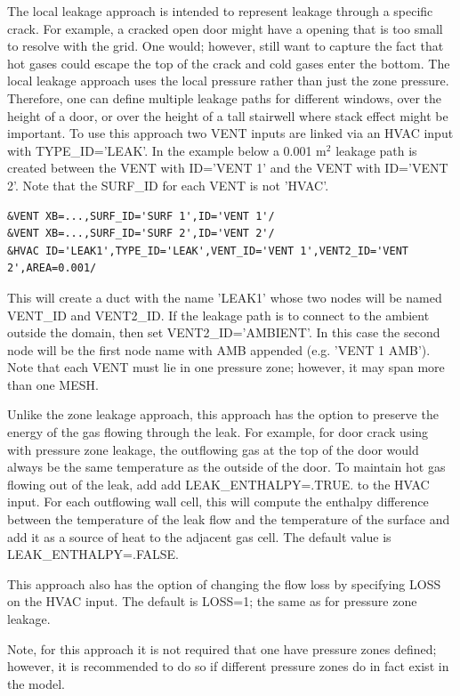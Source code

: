 \documentclass[11pt]{book}
\begin{document}
The local leakage approach is intended to represent leakage through a specific crack. For example, a cracked open door might have a opening that is too small to resolve with the grid.  One would; however, still want to capture the fact that hot gases could escape the top of the crack and cold gases enter the bottom. The local leakage approach uses the local pressure rather than just the zone pressure. Therefore, one can define multiple leakage paths for different windows, over the height of a door, or over the height of a tall stairwell where stack effect might be important. To use this approach two {\ct VENT} inputs are linked via an {\ct HVAC} input with {\ct TYPE\_ID='LEAK'}. In the example below a 0.001 m$^2$ leakage path is created between the {\ct VENT} with {\ct ID='VENT 1'} and the {\ct VENT} with {\ct ID='VENT 2'}. Note that the {\ct SURF\_ID} for each {\ct VENT} is not {\ct 'HVAC'}.
\begin{lstlisting}
&VENT XB=...,SURF_ID='SURF 1',ID='VENT 1'/
&VENT XB=...,SURF_ID='SURF 2',ID='VENT 2'/
&HVAC ID='LEAK1',TYPE_ID='LEAK',VENT_ID='VENT 1',VENT2_ID='VENT 2',AREA=0.001/
\end{lstlisting}
This will create a duct with the name {\ct 'LEAK1'} whose two nodes will be named {\ct VENT\_ID} and {\ct VENT2\_ID}. If the leakage path is to connect to the ambient outside the domain, then set {\ct VENT2\_ID='AMBIENT'}. In this case the second node will be the first node name with {\ct AMB} appended (e.g. {\ct 'VENT 1 AMB'}). Note that each {\ct VENT} must lie in one pressure zone; however, it may span more than one {\ct MESH}.

Unlike the zone leakage approach, this approach has the option to preserve the energy of the gas flowing through the leak. For example, for door crack using with pressure zone leakage, the outflowing gas at the top of the door would always be the same temperature as the outside of the door. To maintain hot gas flowing out of the leak, add add {\ct LEAK\_ENTHALPY=.TRUE.} to the {\ct HVAC} input. For each outflowing wall cell, this will compute the enthalpy difference between the temperature of the leak flow and the temperature of the surface and add it as a source of heat to the adjacent gas cell.  The default value is {\ct LEAK\_ENTHALPY=.FALSE.}

This approach also has the option of changing the flow loss by specifying {\ct LOSS} on the {\ct HVAC} input.  The default is {\ct LOSS=1}; the same as for pressure zone leakage.

Note, for this approach it is not required that one have pressure zones defined; however, it is recommended to do so if different pressure zones do in fact exist in the model.
\end{document}

